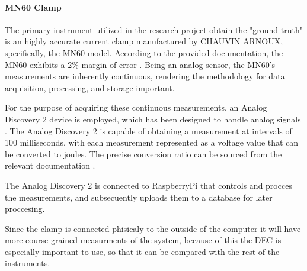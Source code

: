 \paragraph{MN60 Clamp} \label{para:clamp}
The primary instrument utilized in the research project obtain the "ground truth" is an highly accurate current clamp manufactured by CHAUVIN ARNOUX, specifically, the MN60 model. According to the provided documentation, the MN60 exhibits a 2\% margin of error \cite{ClampDoc}. Being an analog sensor, the MN60's measurements are inherently continuous, rendering the methodology for data acquisition, processing, and storage important.

For the purpose of acquiring these continuous measurements, an Analog Discovery 2 device is employed, which has been  designed to handle analog signals \cite{AnalogDoc}. The Analog Discovery 2 is capable of obtaining a measurement at intervals of 100 milliseconds, with each measurement represented as a voltage value that can be converted to joules. The precise conversion ratio can be sourced from the relevant documentation \cite{ClampDoc}.

The Analog Discovery 2 is connected to RaspberryPi that controls and procces the measurements, and subsecuently uploads them to a database for later proccesing.

Since the clamp is connected phisicaly to the outside of the computer it will have more course grained measurments of the system, because of this the DEC is especially important to use, so that it can be compared with the rest of the instruments. 